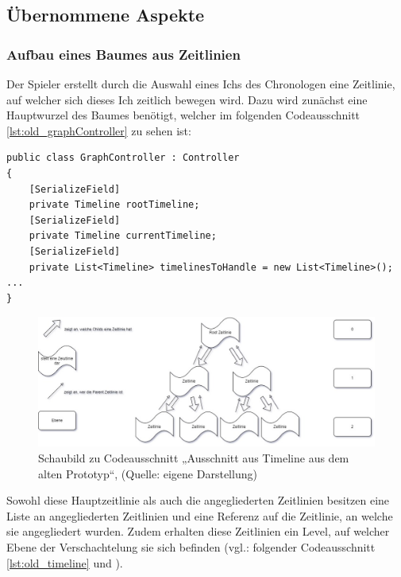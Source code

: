 \subsection{Übernommene Aspekte}
\subsubsection{Aufbau eines Baumes aus Zeitlinien}\label{sec:good_01}
Der Spieler erstellt durch die Auswahl eines Ichs des Chronologen eine Zeitlinie, auf welcher sich dieses Ich zeitlich bewegen wird. Dazu wird zunächst eine Hauptwurzel des Baumes benötigt, welcher im folgenden Codeausschnitt \ref{lst:old_graphController} zu sehen ist:
\begin{lstlisting}[caption={Ausschnitt aus GraphController.cs aus dem alten Prototyp}, label={lst:old_graphController}]
public class GraphController : Controller
{
    [SerializeField]
    private Timeline rootTimeline;
    [SerializeField]
    private Timeline currentTimeline;
    [SerializeField]
    private List<Timeline> timelinesToHandle = new List<Timeline>();
...
}
\end{lstlisting}
\label{sec:rootTimeline_pld}

\begin{figure}[ht]
\centering
\includegraphics[width=1\linewidth]{content/pictures/Schaubild Timeline.jpg}
\caption{Schaubild zu Codeausschnitt „Ausschnitt aus Timeline aus dem alten Prototyp“, (Quelle: eigene Darstellung)}
\label{fig:codesnippet_timeline}
\end{figure}

Sowohl diese Hauptzeitlinie als auch die angegliederten Zeitlinien besitzen eine Liste an angegliederten Zeitlinien und eine Referenz auf die Zeitlinie, an welche sie angegliedert wurden. Zudem erhalten diese Zeitlinien ein Level, auf welcher Ebene der Verschachtelung sie sich befinden (vgl.: folgender Codeausschnitt \ref{lst:old_timeline} und ).


